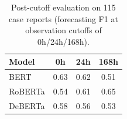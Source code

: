 \begin{table}[htbp]
\caption{Post-cutoff evaluation on 115 case reports (forecasting F1 at observation cutoffs of 0h/24h/168h).}
\ChSevenTableBodyStart
\begin{ChSevenFloatBody}

\centering
\footnotesize
\setlength{\tabcolsep}{6pt}
\renewcommand{\arraystretch}{1.1}
\begin{tabular}{lccc}
\hline
\textbf{Model} & \textbf{0h} & \textbf{24h} & \textbf{168h} \\
\hline
BERT     & 0.63 & 0.62 & 0.51 \\
RoBERTa  & 0.54 & 0.61 & 0.65 \\
DeBERTa  & 0.58 & 0.56 & 0.53 \\
\hline
\end{tabular}



\end{ChSevenFloatBody}
\end{table}